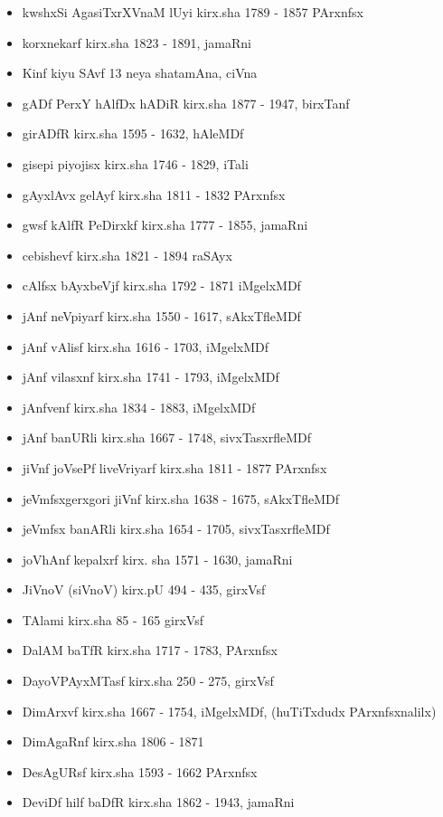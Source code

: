 {\begin{itemize}
\item kwshxSi AgasiTxrXVnaM lUyi kirx.sha {\rm 1789 - 1857} PArxnfsx
\item korxnekarf kirx.sha {\rm 1823 - 1891}, jamaRni
\item Kinf kiyu SAvf {\rm 13} neya shatamAna, ciVna
\item gADf PerxY hAlfDx hADiR kirx.sha {\rm 1877 - 1947}, birxTanf
\item girADfR kirx.sha {\rm 1595 - 1632}, hAleMDf
\item gisepi piyojisx kirx.sha {\rm 1746 - 1829}, iTali
\item gAyxlAvx gelAyf kirx.sha {\rm 1811 - 1832} PArxnfsx
\item gwsf kAlfR PeDirxkf kirx.sha {\rm 1777 - 1855}, jamaRni
\item cebishevf kirx.sha {\rm 1821 - 1894} raSAyx
\item cAlfsx bAyxbeVjf kirx.sha {\rm 1792 - 1871} iMgelxMDf
\item jAnf neVpiyarf kirx.sha {\rm 1550 - 1617}, sAkxTfleMDf
\item jAnf vAlisf kirx.sha {\rm 1616 - 1703}, iMgelxMDf
\item jAnf vilasxnf kirx.sha {\rm 1741 - 1793}, iMgelxMDf
\item jAnfvenf kirx.sha {\rm 1834 - 1883}, iMgelxMDf
\item jAnf banURli kirx.sha {\rm 1667 - 1748}, sivxTasxrfleMDf
\item jiVnf joVsePf liveVriyarf kirx.sha {\rm 1811 - 1877} PArxnfsx
\item jeVmfsxgerxgori jiVnf kirx.sha {\rm 1638 - 1675}, sAkxTfleMDf
\item jeVmfsx banARli kirx.sha {\rm 1654 - 1705}, sivxTasxrfleMDf
\item joVhAnf kepalxrf kirx. sha {\rm 1571 - 1630}, jamaRni
\item JiVnoV (siVnoV) kirx.pU {\rm 494 - 435}, girxVsf
\item TAlami kirx.sha {\rm 85 - 165} girxVsf
\item DalAM baTfR kirx.sha {\rm 1717 - 1783}, PArxnfsx
\item DayoVPAyxMTasf kirx.sha {\rm 250 - 275}, girxVsf
\item DimArxvf kirx.sha {\rm 1667 - 1754}, iMgelxMDf, (huTiTxdudx PArxnfsxnalilx)
\item DimAgaRnf kirx.sha {\rm 1806 - 1871}
\item DesAgURsf kirx.sha {\rm 1593 - 1662} PArxnfsx
\item DeviDf hilf baDfR kirx.sha {\rm 1862 - 1943}, jamaRni

\end{itemize}}
